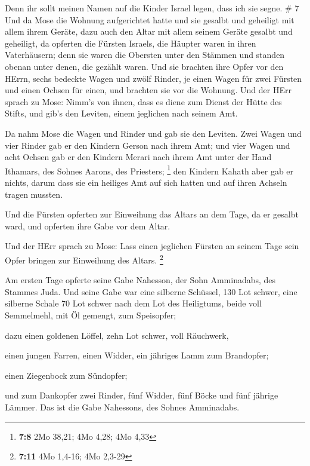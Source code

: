  Denn ihr sollt meinen Namen auf die Kinder Israel legen,
dass ich sie segne. \# 7  Und da Mose die Wohnung
aufgerichtet hatte und sie gesalbt und geheiligt mit allem ihrem Geräte,
dazu auch den Altar mit allem seinem Geräte gesalbt und geheiligt,
 da opferten die Fürsten Israels, die Häupter waren in ihren
Vaterhäusern; denn sie waren die Obersten unter den Stämmen und standen
obenan unter denen, die gezählt waren.  Und sie brachten
ihre Opfer vor den HErrn, sechs bedeckte Wagen und zwölf Rinder, je
einen Wagen für zwei Fürsten und einen Ochsen für einen, und brachten
sie vor die Wohnung.  Und der HErr sprach zu Mose:
 Nimm's von ihnen, dass es diene zum Dienst der Hütte des
Stifts, und gib's den Leviten, einem jeglichen nach seinem Amt.

 Da nahm Mose die Wagen und Rinder und gab sie den Leviten.
 Zwei Wagen und vier Rinder gab er den Kindern Gerson nach
ihrem Amt;  und vier Wagen und acht Ochsen gab er den
Kindern Merari nach ihrem Amt unter der Hand Ithamars, des Sohnes
Aarons, des Priesters; \footnote{\textbf{7:8} 2Mo 38,21; 4Mo 4,28; 4Mo
  4,33}  den Kindern Kahath aber gab er nichts, darum dass
sie ein heiliges Amt auf sich hatten und auf ihren Achseln tragen
mussten.

 Und die Fürsten opferten zur Einweihung das Altars an dem
Tage, da er gesalbt ward, und opferten ihre Gabe vor dem Altar.

 Und der HErr sprach zu Mose: Lass einen jeglichen Fürsten
an seinem Tage sein Opfer bringen zur Einweihung des Altars. \footnote{\textbf{7:11}
  4Mo 1,4-16; 4Mo 2,3-29}

 Am ersten Tage opferte seine Gabe Nahesson, der Sohn
Amminadabs, des Stammes Juda.  Und seine Gabe war eine
silberne Schüssel, 130 Lot schwer, eine silberne Schale 70 Lot schwer
nach dem Lot des Heiligtums, beide voll Semmelmehl, mit Öl gemengt, zum
Speisopfer;

 dazu einen goldenen Löffel, zehn Lot schwer, voll
Räuchwerk,

 einen jungen Farren, einen Widder, ein jähriges Lamm zum
Brandopfer;

 einen Ziegenbock zum Sündopfer;

 und zum Dankopfer zwei Rinder, fünf Widder, fünf Böcke und
fünf jährige Lämmer. Das ist die Gabe Nahessons, des Sohnes Amminadabs.

